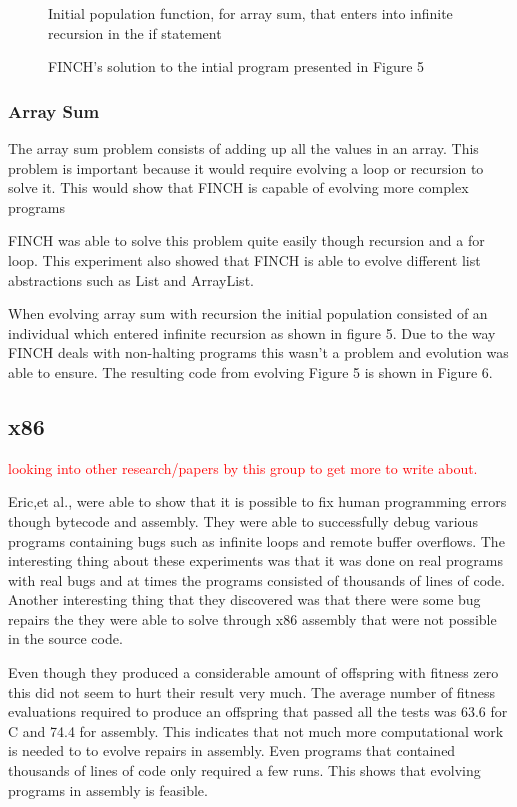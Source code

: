 \documentclass{sig-alternate}
\newcommand{\mycomment}[1]{\textcolor{red}{#1}}
\begin{document}
\begin{figure}
\centering
{}
\caption{Initial population function, for array sum, that enters into infinite recursion in the if statement}
\end{figure}

\begin{figure}
\centering
{}
\caption{FINCH's solution to the intial program presented in Figure 5}
\end{figure}

\subsubsection{Array Sum}
The array sum problem consists of adding up all the values in an array. This problem is important because it would require evolving a loop or recursion to solve it. This would show that FINCH is capable of evolving more complex programs\par
FINCH was able to solve this problem quite easily though recursion and a for loop. This experiment also showed that FINCH is able to evolve different list abstractions such as List and ArrayList.

When evolving array sum with recursion the initial population consisted of an individual which entered infinite recursion as shown in figure 5. Due to the way FINCH deals with non-halting programs this wasn't a problem and evolution was able to ensure. The resulting code from evolving Figure 5 is shown in Figure 6.


\subsection{x86}
\mycomment{looking into other research/papers by this group to get more to write about.}

Eric,et al., were able to show that it is possible to fix human programming errors though bytecode and assembly. They were able to successfully debug various programs containing bugs such as infinite loops and remote buffer overflows. The interesting thing about these experiments was that it was done on real programs with real bugs and at times the programs consisted of thousands of lines of code. Another interesting thing that they discovered was that there were some bug repairs the they were able to solve through x86 assembly that were not possible in the source code. 

Even though they produced a considerable amount of offspring with fitness zero this did not seem to hurt their result very much. The average number of fitness evaluations required to produce an offspring that passed all the tests was 63.6 for C and 74.4 for assembly. This indicates that not much more computational work is needed to to evolve repairs in assembly. Even programs that contained thousands of lines of code only required a few runs. This shows that evolving programs in assembly is feasible.
\end{document}
